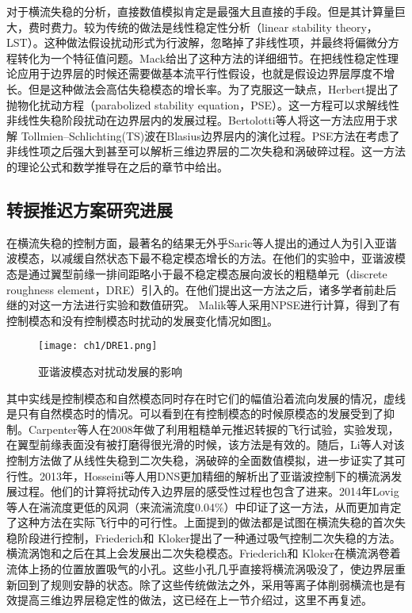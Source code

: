 对于横流失稳的分析，直接数值模拟\cite{Wassermann2005,Bonfigli2007,Duan2013,Hosseini2013}肯定是最强大且直接的手段。但是其计算量巨大，费时费力。较为传统的做法是线性稳定性分析（linear stability theory，LST）。这种做法假设扰动形式为行波解，忽略掉了非线性项，并最终将偏微分方程转化为一个特征值问题。Mack\cite{Mack1984}给出了这种方法的详细细节。在把线性稳定性理论应用于边界层的时候还需要做基本流平行性假设，也就是假设边界层厚度不增长。但是这种做法会高估失稳模态的增长率。为了克服这一缺点，Herbert\cite{Herbert1987,Herbert1997,Herbert1993}提出了抛物化扰动方程（parabolized stability equation，PSE）。这一方程可以求解线性非线性失稳阶段扰动在边界层内的发展过程。Bertolotti等人\cite{Bertolotti1991,Bertolotti1992}将这一方法应用于求解 Tollmien--Schlichting(TS)波在Blasius边界层内的演化过程。PSE方法在考虑了非线性项之后强大到甚至可以解析三维边界层的二次失稳和涡破碎过程\cite{LiFei2011,Li2015a}。这一方法的理论公式和数学推导在之后的章节中给出。

\subsection{转捩推迟方案研究进展}
在横流失稳的控制方面，最著名的结果无外乎Saric\cite{Saric1998}等人提出的通过人为引入亚谐波模态，以减缓自然状态下最不稳定模态增长的方法。在他们的实验中，亚谐波模态是通过翼型前缘一排间距略小于最不稳定模态展向波长的粗糙单元（discrete roughness element，DRE）引入的。在他们提出这一方法之后，诸多学者前赴后继的对这一方法进行实验和数值研究\cite{Malik1999,Haynes2000,Wassermann2002,Carpenter2008,LiFei2011,Hosseini2013,Li2015a}。
Malik\cite{Malik1999}等人采用NPSE进行计算，得到了有控制模态和没有控制模态时扰动的发展变化情况如图\ref{f:DRE1}。
\begin{figure}
  \centering
  \texttt{[image: ch1/DRE1.png]}
  \caption{亚谐波模态对扰动发展的影响\cite{Malik1999}}\label{f:DRE1}
\end{figure}
其中实线是控制模态和自然模态同时存在时它们的幅值沿着流向发展的情况，虚线是只有自然模态时的情况。可以看到在有控制模态的时候原模态的发展受到了抑制。Carpenter\cite{Carpenter2008}等人在2008年做了利用粗糙单元推迟转捩的飞行试验，实验发现，在翼型前缘表面没有被打磨得很光滑的时候，该方法是有效的。随后，Li等人\cite{Li2009roughness}对该控制方法做了从线性失稳到二次失稳，涡破碎的全面数值模拟，进一步证实了其可行性。2013年，Hosseini等人\cite{Hosseini2013}用DNS更加精细的解析出了亚谐波控制下的横流涡发展过程。他们的计算将扰动传入边界层的感受性过程也包含了进来。2014年Lovig等人\cite{Lovig2014}在湍流度更低的风洞（来流湍流度0.04\%）中印证了这一方法，从而更加肯定了这种方法在实际飞行中的可行性。上面提到的做法都是试图在横流失稳的首次失稳阶段进行控制，Friederich和 Kloker\cite{Friederich2011,Friederich2012}提出了一种通过吸气控制二次失稳的方法。横流涡饱和之后在其上会发展出二次失稳模态。Friederich和 Kloker在横流涡卷着流体上扬的位置放置吸气的小孔。这些小孔几乎直接将横流涡吸没了，使边界层重新回到了规则安静的状态。除了这些传统做法之外，采用等离子体削弱横流也是有效提高三维边界层稳定性的做法\cite{dorr2016}，这已经在上一节介绍过，这里不再复述。


